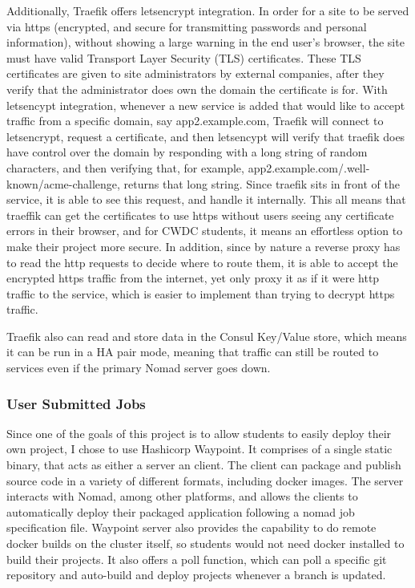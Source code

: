 \documentclass{article}
\begin{document}
Additionally, Traefik offers letsencrypt integration. In order for a site to be served via https (encrypted, and secure for transmitting passwords and personal information), without showing a large warning in the end user's browser, the site must have valid  Transport Layer Security (TLS) certificates. These TLS certificates are given to site administrators by external companies, after they verify that the administrator does own the domain the certificate is for. With letsencypt integration, whenever a new service is added that would like to accept traffic from a specific domain, say app2.example.com, Traefik will connect to letsencrypt, request a certificate, and then letsencypt will verify that traefik does have control over the domain by responding with a long string of random characters, and then verifying that, for example, app2.example.com/.well-known/acme-challenge, returns that long string. Since traefik sits in front of the service, it is able to see this request, and handle it internally. This all means that traeffik can get the certificates to use https without users seeing any certificate errors in their browser, and for CWDC students, it means an effortless option to make their project more secure. In addition, since by nature a reverse proxy has to read the http requests to decide where to route them, it is able to accept the encrypted https traffic from the internet, yet only proxy it as if it were http traffic to the service, which is easier to implement than trying to decrypt https traffic.

Traefik also can read and store data in the Consul Key/Value store, which means it can be run in a HA pair mode, meaning that traffic can still be routed to services even if the primary Nomad server goes down.

\subsubsection{User Submitted Jobs}
Since one of the goals of this project is to allow students to easily deploy their own project, I chose to use Hashicorp Waypoint. It comprises of a single static binary, that acts as either a server an client. The client can package and publish source code in a variety of different formats, including docker images. The server interacts with Nomad, among other platforms, and allows the clients to automatically deploy their packaged application following a nomad job specification file. Waypoint server also provides the capability to do remote docker builds on the cluster itself, so students would not need docker installed to build their projects. It also offers a poll function, which can poll a specific git repository and auto-build and deploy projects whenever a branch is updated.
\end{document}
